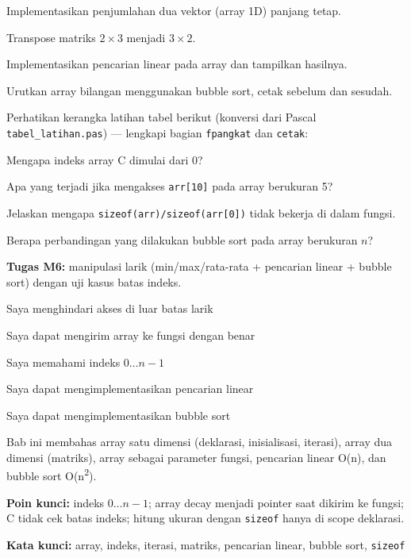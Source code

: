 \documentclass[../main.tex]{subfiles}
\begin{document}
\begin{aktivitas}
  \item Implementasikan penjumlahan dua vektor (array 1D) panjang tetap.
  \item Transpose matriks $2\times 3$ menjadi $3\times 2$.
  \item Implementasikan pencarian linear pada array dan tampilkan hasilnya.
  \item Urutkan array bilangan menggunakan bubble sort, cetak sebelum dan sesudah.
  \item Perhatikan kerangka latihan tabel berikut (konversi dari Pascal \texttt{tabel\_latihan.pas}) --- lengkapi bagian \texttt{fpangkat} dan \texttt{cetak}:
\end{aktivitas}



\begin{latihan}
  \item Mengapa indeks array C dimulai dari 0?
  \item Apa yang terjadi jika mengakses \texttt{arr[10]} pada array berukuran 5?
  \item Jelaskan mengapa \texttt{sizeof(arr)/sizeof(arr[0])} tidak bekerja di dalam fungsi.
  \item Berapa perbandingan yang dilakukan bubble sort pada array berukuran $n$?
\end{latihan}

\begin{asesmen}
\textbf{Tugas M6:} manipulasi larik (min/max/rata-rata + pencarian linear + bubble sort) dengan uji kasus batas indeks.
\end{asesmen}

\begin{checklist}
  \item Saya menghindari akses di luar batas larik
  \item Saya dapat mengirim array ke fungsi dengan benar
  \item Saya memahami indeks $0 \ldots n-1$
  \item Saya dapat mengimplementasikan pencarian linear
  \item Saya dapat mengimplementasikan bubble sort
\end{checklist}

\begin{rangkuman}
Bab ini membahas array satu dimensi (deklarasi, inisialisasi, iterasi), array dua dimensi (matriks), array sebagai parameter fungsi, pencarian linear O(n), dan bubble sort O(n\textsuperscript{2}).

\textbf{Poin kunci:} indeks $0 \ldots n-1$; array decay menjadi pointer saat dikirim ke fungsi; C tidak cek batas indeks; hitung ukuran dengan \texttt{sizeof} hanya di scope deklarasi.

\textbf{Kata kunci:} array, indeks, iterasi, matriks, pencarian linear, bubble sort, \texttt{sizeof}
\end{rangkuman}
\end{document}
